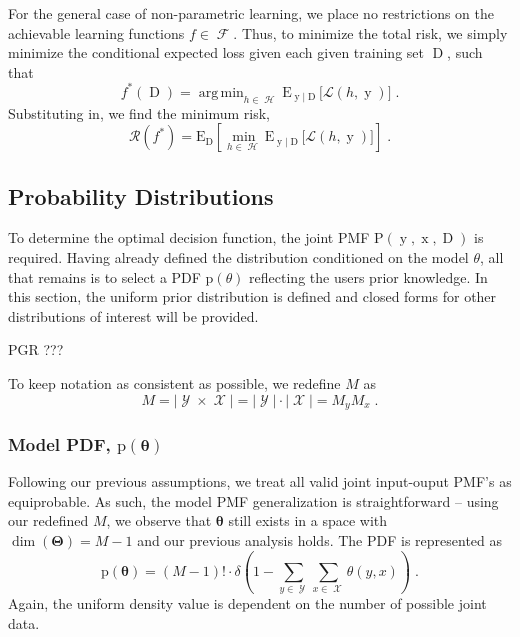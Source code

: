 \documentclass[12pt]{report}
\DeclareMathOperator*{\argmin}{arg\,min}
\DeclareMathOperator{\xrm}{\mathrm{x}}
\DeclareMathOperator{\yrm}{\mathrm{y}}
\DeclareMathOperator{\Drm}{\mathrm{D}}
\DeclareMathOperator{\Xcal}{\mathcal{X}}
\DeclareMathOperator{\Ycal}{\mathcal{Y}}
\DeclareMathOperator{\Hcal}{\mathcal{H}}
\DeclareMathOperator{\Fcal}{\mathcal{F}}
\begin{document}
For the general case of non-parametric learning, we place no restrictions on the achievable learning functions $f \in \Fcal$. Thus, to minimize the total risk, we simply minimize the conditional expected loss given each given training set $\Drm$, such that
\begin{equation} \label{f_opt_D}
f^*(\Drm) = \argmin_{h \in \Hcal} \text{E}_{\yrm | \Drm}\big[ \mathcal{L}(h,\yrm) \big] \;.
\end{equation}
Substituting in, we find the minimum risk,
\begin{equation} \label{risk_min}
\mathcal{R}(f^*) = \text{E}_{\Drm} \left[ \min_{h \in \Hcal} \text{E}_{\yrm | \Drm}\big[ \mathcal{L}(h,\yrm) \big] \right] \;.
\end{equation}












\subsection{Probability Distributions}

To determine the optimal decision function, the joint PMF $\text{P}(\yrm,\xrm,\Drm)$ is required. Having already defined the distribution conditioned on the model $\theta$, all that remains is to select a PDF $\text{p}(\theta)$ reflecting the users prior knowledge. In this section, the uniform prior distribution is defined and closed forms for other distributions of interest will be provided.

PGR ???

To keep notation as consistent as possible, we redefine $M$ as
\begin{equation}
M = |\Ycal \times \Xcal| = |\Ycal| \cdot |\Xcal| = M_y M_x \;.
\end{equation} 


\subsubsection{Model PDF, $\text{p}(\bm{\theta})$}

Following our previous assumptions, we treat all valid joint input-ouput PMF's as equiprobable. As such, the model PMF generalization is straightforward -- using our redefined $M$, we observe that $\bm{\theta}$ still exists in a space with $\dim({\bm{\Theta}}) = M-1$ and our previous analysis holds. The PDF is represented as
\begin{equation}
\text{p}(\bm{\theta}) = (M-1)! \cdot \delta \left( 1 - \sum_{y \in \Ycal} \sum_{x \in \Xcal}  \theta(y,x) \right) \;.
\end{equation}
Again, the uniform density value is dependent on the number of possible joint data.
\end{document}
